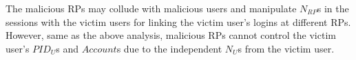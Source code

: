 The malicious RPs may collude with  malicious users and manipulate $N_{RP}$s in the sessions with the victim users for linking the victim user's logins at different RPs.
However, same as the above analysis, malicious RPs cannot control the victim user's $PID_U$s and $Account$s due to the independent $N_U$s from the victim user.




\begin{comment}
UPRESSO only introduces small modifications to OIDC. As analyzed in Section~\ref{subsec:compatible}, UPRESSO doesn't modify the mechanisms (i.e., digital signature and HTTPS) for integrity and confidentiality of the identity proof; but only slightly modify the receiver designation and user identification.
The detailed modifications include: (1) the $ID_{RP}$ and endpoint in the identity proof are replaced with $PID_{RP}$ and one-time endpoint, while the generation of $PID_{RP}$ further introduces  a negotiation process and a modified dynamic registration;
 (2) IdP generates $PID_U$ based on $PID_{RP}$ instead of $ID_{RP}$, (3) RP calculates $Account$ from the changing $PID_U$ instead of an unchanged value.


\end{comment}
